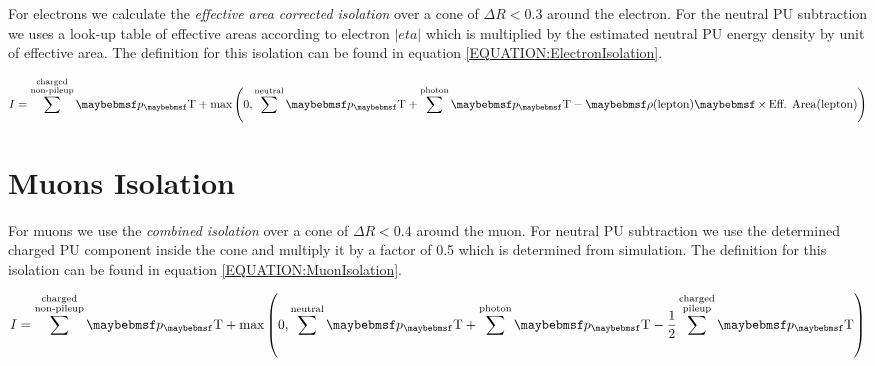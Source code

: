 
For electrons we calculate the \textit{effective area corrected isolation} over a cone of $\Delta R<0.3$ around the electron. For the neutral \gls{PU} subtraction we uses a look-up table of effective areas according to electron $|eta|$ which is multiplied by the estimated neutral \gls{PU} energy density by unit of effective area. The definition for this isolation can be found in equation \ref{EQUATION:ElectronIsolation}.

\begin{equation}
I = \sum^{\substack{\text{charged} \\ \text{non-pileup}}}\pT +
\text{max}\left(0,\sum^{\text{neutral}}\pT+\sum^{\text{photon}}\pT - \rho(\text{lepton}) \times \text{Eff. Area}(\text{lepton})\right)
\label{EQUATION:ElectronIsolation}
\end{equation}

\section{Muons Isolation}
\label{SUBSECTION:EventReconstructionPhysicsObjects_LeptonIsolation_MuonsIsolation}


For muons we use the \textit{combined isolation} over a cone of $\Delta R < 0.4$ around the muon. For neutral \gls{PU} subtraction we use the determined charged \gls{PU} component inside the cone and multiply it by a factor of 0.5 which is determined from simulation. The definition for this isolation can be found in equation \ref{EQUATION:MuonIsolation}.

\begin{equation}
I = \sum^{\substack{\text{charged} \\ \text{non-pileup}}}\pT +
\text{max}\left(0,\sum^{\text{neutral}}\pT+\sum^{\text{photon}}\pT-\frac{1}{2}\sum^{\substack{\text{charged}
\\ \text{pileup}}}\pT\right)
\label{EQUATION:MuonIsolation}
\end{equation}

